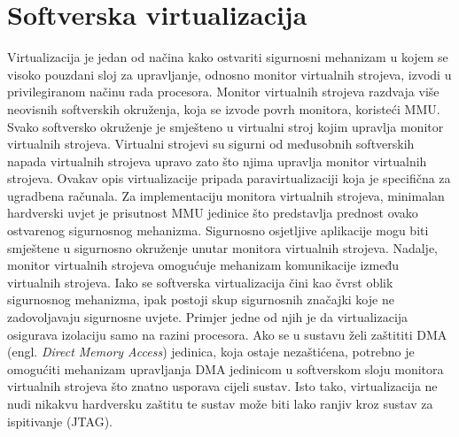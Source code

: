\documentclass[times, utf8, diplomski, numeric]{fer}
\begin{document}
\section{Softverska virtualizacija}
Virtualizacija je jedan od načina kako ostvariti sigurnosni mehanizam u kojem se visoko pouzdani sloj za upravljanje,
odnosno monitor virtualnih strojeva, izvodi u privilegiranom načinu rada procesora. Monitor virtualnih strojeva razdvaja
više neovisnih softverskih okruženja, koja se izvode povrh monitora, koristeći MMU. Svako softversko okruženje je
smješteno u virtualni stroj kojim upravlja monitor virtualnih strojeva. Virtualni strojevi su sigurni od međusobnih softverskih
napada virtualnih strojeva upravo zato što njima upravlja monitor virtualnih strojeva. Ovakav opis virtualizacije pripada
paravirtualizaciji koja je specifična za ugradbena računala. Za implementaciju monitora virtualnih strojeva, minimalan
hardverski uvjet je prisutnost MMU jedinice što predstavlja prednost ovako ostvarenog sigurnosnog mehanizma. Sigurnosno
osjetljive aplikacije mogu biti smještene u sigurnosno okruženje unutar monitora virtualnih strojeva. Nadalje, monitor
virtualnih strojeva omogućuje mehanizam komunikacije između virtualnih strojeva. Iako se softverska virtualizacija čini kao
čvrst oblik sigurnosnog mehanizma, ipak postoji skup sigurnosnih značajki koje ne zadovoljavaju sigurnosne uvjete. Primjer
jedne od njih je da virtualizacija osigurava izolaciju samo na razini procesora. Ako se u sustavu želi zaštititi DMA (engl.
\textit{Direct Memory Access}) jedinica, koja ostaje nezaštićena, potrebno je omogućiti mehanizam upravljanja DMA jedinicom
u softverskom sloju monitora virtualnih strojeva što znatno usporava cijeli sustav. Isto tako, virtualizacija ne nudi nikakvu
hardversku zaštitu te sustav može biti lako ranjiv kroz sustav za ispitivanje (JTAG).
\end{document}
